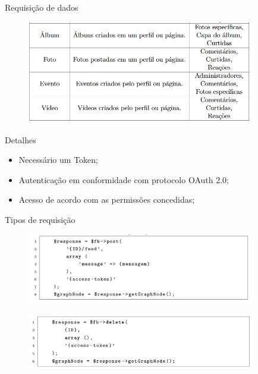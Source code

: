 \documentclass{aula-ifb}
\begin{document}
\begin{frame}{Requisição de dados}
\begin{figure}[h]
\includegraphics[width=10cm]{figuras/nosarestas2.png}
\label{fig:facebookgraph}
\end{figure}
\end{frame}

\begin{frame}{Detalhes}
\begin{itemize}
   \item Necessário um Token;
   \item Autenticação em conformidade com protocolo OAuth 2.0;
   \item Acesso de acordo com as permissões concedidas;
\end{itemize}
\end{frame}

\begin{frame}{Tipos de requisição}
\begin{figure}[h]
\includegraphics[width=10cm]{figuras/requisicaopost.png}
\label{fig:facebookgraph}
\end{figure}
\begin{figure}[h]
\includegraphics[width=10cm]{figuras/requisicaodelete.png}
\label{fig:facebookgraph}
\end{figure}
\end{frame}
\end{document}

